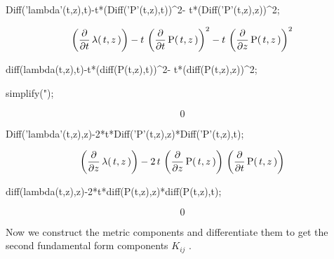 \begin{mapleinput}
Diff('lambda'(t,z),t)-t*(Diff('P'(t,z),t))^2- t*(Diff('P'(t,z),z))^2;
\end{mapleinput}
\begin{maplelatex}
\[
 \left( \! \,{\frac {{ \partial}}{{ \partial}{t}}}\,{ \lambda}(\,
{t}, {z}\,)\, \!  \right)  - {t}\, \left( \! \,{\frac {{ \partial
}}{{ \partial}{t}}}\,{\rm P}(\,{t}, {z}\,)\, \!  \right) ^{2} - {
t}\, \left( \! \,{\frac {{ \partial}}{{ \partial}{z}}}\,{\rm P}(
\,{t}, {z}\,)\, \!  \right) ^{2}
\]
\end{maplelatex}
\begin{mapleinput}
diff(lambda(t,z),t)-t*(diff(P(t,z),t))^2- t*(diff(P(t,z),z))^2;
\end{mapleinput}
\begin{mapleinput}
simplify(");
\end{mapleinput}
\begin{maplelatex}
\[
0
\]
\end{maplelatex}
\begin{mapleinput}
Diff('lambda'(t,z),z)-2*t*Diff('P'(t,z),z)*Diff('P'(t,z),t);
\end{mapleinput}
\begin{maplelatex}
\[
 \left( \! \,{\frac {{ \partial}}{{ \partial}{z}}}\,{ \lambda}(\,
{t}, {z}\,)\, \!  \right)  - 2\,{t}\, \left( \! \,{\frac {{ 
\partial}}{{ \partial}{z}}}\,{\rm P}(\,{t}, {z}\,)\, \!  \right) 
\, \left( \! \,{\frac {{ \partial}}{{ \partial}{t}}}\,{\rm P}(\,{
t}, {z}\,)\, \!  \right) 
\]
\end{maplelatex}
\begin{mapleinput}
diff(lambda(t,z),z)-2*t*diff(P(t,z),z)*diff(P(t,z),t);
\end{mapleinput}
\begin{maplelatex}
\[
0
\]
\end{maplelatex}
Now we construct the metric components and differentiate them to get the second
fundamental form components $K_{ij}$ .

